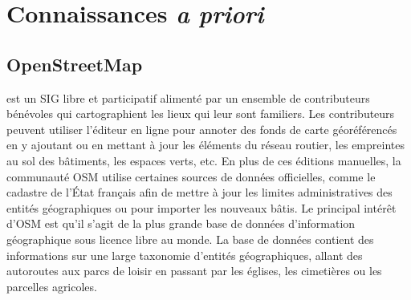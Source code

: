 

\section{Connaissances \textit{a priori}}

\subsection{OpenStreetMap}

 est un \gls{SIG} libre et participatif alimenté par un ensemble de contributeurs bénévoles qui cartographient les lieux qui leur sont familiers. Les contributeurs peuvent utiliser l'éditeur en ligne pour annoter des fonds de carte géoréférencés en y ajoutant ou en mettant à jour les éléments du réseau routier, les empreintes au sol des bâtiments, les espaces verts, etc. En plus de ces éditions manuelles, la communauté \gls{OSM} utilise certaines sources de données officielles, comme le cadastre de l'État français afin de mettre à jour les limites administratives des entités géographiques ou pour importer les nouveaux bâtis. Le principal intérêt d'\gls{OSM} est qu'il s'agit de la plus grande base de données d'information géographique sous licence libre au monde. La base de données contient des informations sur une large taxonomie d'entités géographiques, allant des autoroutes aux parcs de loisir en passant par les églises, les cimetières ou les parcelles agricoles.

